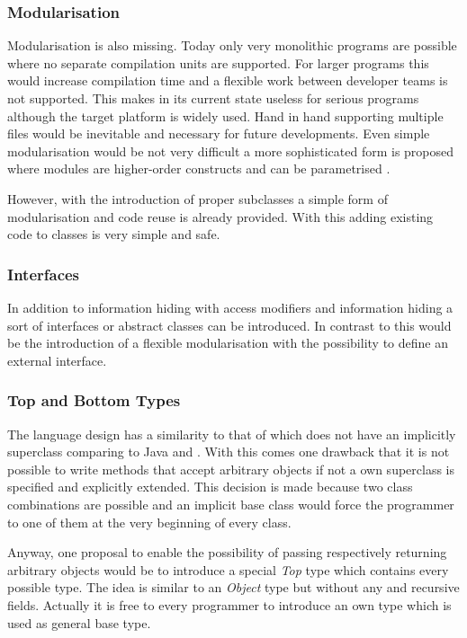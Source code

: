 \subsubsection{Modularisation}
Modularisation is also missing. Today only very monolithic programs
are possible where no separate compilation units are supported. For larger
programs this would increase compilation time and a flexible work between
developer teams is not supported. This makes \ooplss in its current state
useless for serious programs although the target platform is widely
used. Hand in hand supporting multiple files would be inevitable and
necessary for future developments. Even simple modularisation would be
not very difficult a more sophisticated form is proposed where modules are
higher-order constructs and can be parametrised \cite{dreyer_type_2003}.

However, with the introduction of proper subclasses a simple form of
modularisation and code reuse is already provided. With this adding
existing code to classes is very simple and safe.

\subsubsection{Interfaces}
In addition to information hiding with access modifiers and information
hiding a sort of interfaces or abstract classes can be introduced. In
contrast to this would be the introduction of a flexible modularisation
with the possibility to define an external interface.

\subsubsection{Top and Bottom Types}
The language design has a similarity to that of \cpp which does
not have an implicitly superclass comparing to Java and \cs. With this
comes one drawback that it is not possible to write methods that accept
arbitrary objects if not a own superclass is specified and explicitly
extended. This decision is made because two class combinations are
possible and an implicit base class would force the programmer to one
of them at the very beginning of every class.

Anyway, one proposal to enable the possibility of passing respectively
returning arbitrary objects would be to introduce a special \emph{Top}
type which contains every possible type. The idea is similar to an
\emph{Object} type but without any \mytype and recursive fields. Actually
it is free to every programmer to introduce an own type which is used
as general base type.

